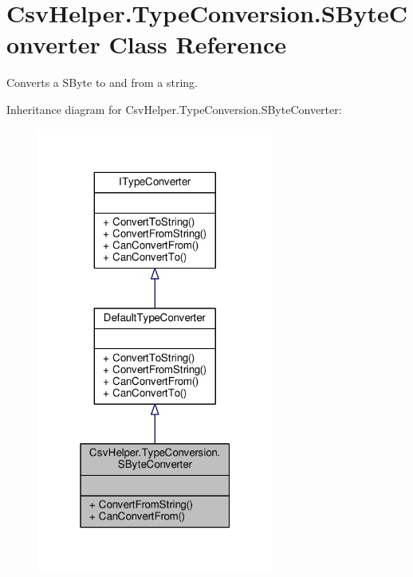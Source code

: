 \hypertarget{a00145}{\section{Csv\-Helper.\-Type\-Conversion.\-S\-Byte\-Converter Class Reference}
\label{a00145}
}


Converts a S\-Byte to and from a string.  




Inheritance diagram for Csv\-Helper.\-Type\-Conversion.\-S\-Byte\-Converter\-:
\nopagebreak
\begin{figure}[H]
\begin{center}
\leavevmode
\includegraphics[width=220pt]{a00534}
\end{center}
\end{figure}


